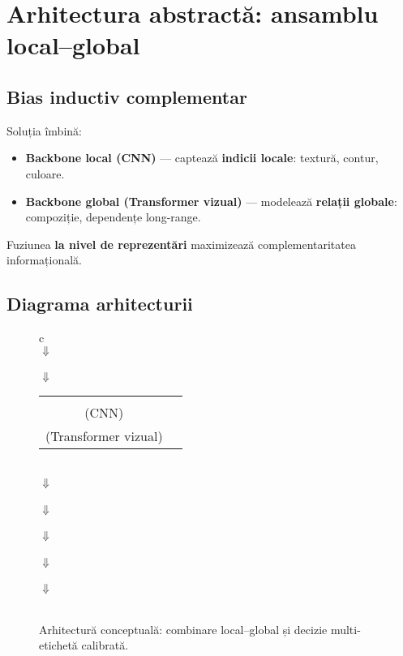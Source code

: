 \section{Arhitectura abstractă: ansamblu local–global}
\label{sec:arhitectura}

\subsection{Bias inductiv complementar}
Soluția îmbină:
\begin{itemize}
  \item \textbf{Backbone local (CNN)} — captează \textbf{indicii locale}: textură, contur, culoare.
  \item \textbf{Backbone global (Transformer vizual)} — modelează \textbf{relații globale}: compoziție, dependențe long-range.
\end{itemize}
Fuziunea \textbf{la nivel de reprezentări} maximizează complementaritatea informațională.

\subsection{Diagrama arhitecturii}
\begin{figure}[ht]
\centering
\begin{tabular}{c}
 \\
$\Downarrow$ \\
 \\
$\Downarrow$ \\
\begin{tabular}{cc}
\smallbox{Backbone local\\(CNN)} & \smallbox{Backbone global\\(Transformer vizual)} \\
\end{tabular}\\
$\Downarrow$ \\
 \\
$\Downarrow$ \\
 \\
$\Downarrow$ \\
 \\
$\Downarrow$ \\
 \\
$\Downarrow$ \\
 \\
\end{tabular}
\caption{Arhitectură conceptuală: combinare local–global și decizie multi-etichetă calibrată.}
\label{fig:arch}
\end{figure}

